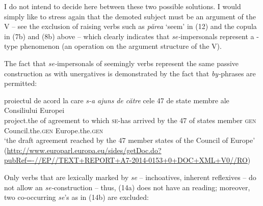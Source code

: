 \documentclass[output=paper]{langsci/langscibook}
\begin{document}
  I do not intend to decide here between these two possible solutions. I would simply like to stress again that the demoted subject must be an argument of the V – see the exclusion of raising verbs such as \textit{părea} ‘seem’ in (12) and the copula in (7b) and (8b) above – which clearly indicates that \textit{se-}impersonals represent a -type phenomenon (an operation on the argument structure of the V). 

\z


The fact that \textit{se-}impersonals of seemingly  verbs represent the same passive construction as with unergatives is demonstrated by the fact that \textit{by-}phrases are permitted:

\ea 
\gll proiectul   de  acord         la care \emph{s-a}      \emph{ajuns}    \emph{de către} cele 47 de state membre ale   Consiliului          Europei \\
project.the of agreement to which \textsc{se-}has arrived by         the  47 of     states member {\textsc{gen}} Council.the.{\textsc{gen}} Europe.the.{\textsc{gen}}\\
\glt  ‘the draft agreement reached by the 47 member states of the Council of Europe'\\
(\url{http://www.europarl.europa.eu/sides/getDoc.do?pubRef=-//EP//TEXT+REPORT+A7-2014-0153+0+DOC+XML+V0//RO}\label{ex:giurgea:13})\\
\z

Only verbs that are lexically marked by \textit{se} – inchoatives, inherent reflexives – do not allow an  \textit{se-}construction – thus, (14a) does not have an  reading; moreover, two co-occurring \textit{se}’s as in (14b) are excluded:

\ea\label{ex:giurgea:14}
\z
\z
      
\end{document}
